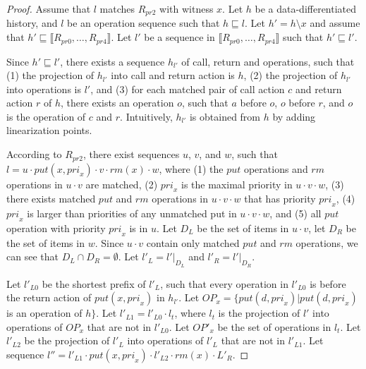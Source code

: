 \begin {proof}

Assume that $l$ matches $R_{\textit{pr2}}$ with witness $x$. Let $h$ be a data-differentiated history, and $l$ be an operation sequence such that $h \sqsubseteq l$. Let $h'=h \setminus x$ and assume that $h' \sqsubseteq \llbracket R_{\textit{pr0}},\ldots,R_{\textit{pr4}} \rrbracket$. Let $l'$ be a sequence in $\llbracket R_{\textit{pr0}},\ldots,R_{\textit{pr4}} \rrbracket$ such that $h' \sqsubseteq l'$.

Since $h' \sqsubseteq l'$, there exists a sequence $h_{l'}$ of call, return and operations, such that (1) the projection of $h_{l'}$ into call and return action is $h$, (2) the projection of $h_{l'}$ into operations is $l'$, and (3) for each matched pair of call action $c$ and return action $r$ of $h$, there exists an operation $o$, such that $a$ before $o$, $o$ before $r$, and $o$ is the operation of $c$ and $r$. Intuitively, $h_{l'}$ is obtained from $h$ by adding linearization points.

According to $R_{\textit{pr2}}$, there exist sequences $u$, $v$, and $w$, such that $l=u \cdot \textit{put}(x,\textit{pri}_x) \cdot v \cdot \textit{rm}(x) \cdot w$, where (1) the $\textit{put}$ operations and $\textit{rm}$ operations in $u \cdot v$ are matched, (2) $\textit{pri}_x$ is the maximal priority in $u \cdot v \cdot w$, (3) there exists matched $\textit{put}$ and $\textit{rm}$ operations in $u \cdot v \cdot w$ that has priority $\textit{pri}_x$, (4) $\textit{pri}_x$ is larger than priorities of any unmatched put in $u \cdot v \cdot w$, and (5) all $\textit{put}$ operation with priority $\textit{pri}_x$ is in $u$. Let $D_L$ be the set of items in $u \cdot v$, let $D_R$ be the set of items in $w$. Since $u \cdot v$ contain only matched $\textit{put}$ and $\textit{rm}$ operations, we can see that $D_L \cap D_R = \emptyset$. Let $l'_L = l' \vert_{D_L}$ and $l'_R = l' \vert_{D_R}$.

Let $l'_{\textit{L0}}$ be the shortest prefix of $l'_L$, such that every operation in $l'_{\textit{L0}}$ is before the return action of $\textit{put}(x,\textit{pri}_x)$ in $h_{l'}$. Let $\textit{OP}_x = \{ \textit{put}(d,\textit{pri}_x) \vert \textit{put}(d,\textit{pri}_x)$ is an operation of $h\}$. Let $l'_{\textit{L1}} = l'_{\textit{L0}} \cdot l_t$, where $l_t$ is the projection of $l'$ into operations of $\textit{OP}_x$ that are not in $l'_{\textit{L0}}$. Let $\textit{OP}'_x$ be the set of operations in $l_t$. Let $l'_{\textit{L2}}$ be the projection of $l'_L$ into operations of $l'_L$ that are not in $l'_{\textit{L1}}$. Let sequence $l'' = l'_{L1} \cdot \textit{put}(x,\textit{pri}_x) \cdot l'_{L2} \cdot \textit{rm}(x) \cdot L'_R$.


\end{proof}
